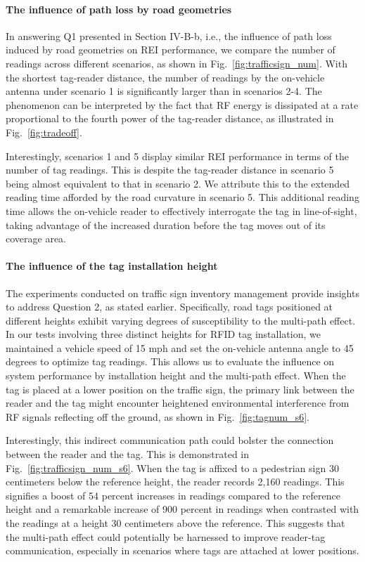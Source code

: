 \documentclass[lettersize,journal]{IEEEtran}
\begin{document}
\paragraph{The influence of path loss by road geometries}
In answering Q1 presented in Section IV-B-b, i.e., the influence of path loss induced by road geometries on REI performance, we compare the number of readings across different scenarios, as shown in Fig.~\ref{fig:trafficsign_num}. With the shortest tag-reader distance, the number of readings by the on-vehicle antenna under scenario 1 is significantly larger than in scenarios 2-4. The phenomenon can be interpreted by the fact that RF energy is dissipated at a rate proportional to the fourth power of the tag-reader distance, as illustrated in Fig.~\ref{fig:tradeoff}.

Interestingly, scenarios 1 and 5 display similar REI performance in terms of the number of tag readings. This is despite the tag-reader distance in scenario 5 being almost equivalent to that in scenario 2. We attribute this to the extended reading time afforded by the road curvature in scenario 5. This additional reading time allows the on-vehicle reader to effectively interrogate the tag in line-of-sight, taking advantage of the increased duration before the tag moves out of its coverage area. 



\paragraph{The influence of the tag installation height}
The experiments conducted on traffic sign inventory management provide insights to address Question 2, as stated earlier. Specifically, road tags positioned at different heights exhibit varying degrees of susceptibility to the multi-path effect. In our tests involving three distinct heights for RFID tag installation, we maintained a vehicle speed of 15 mph and set the on-vehicle antenna angle to 45 degrees to optimize tag readings. This allows us to evaluate the influence on system performance by installation height and the multi-path effect. When the tag is placed at a lower position on the traffic sign, the primary link between the reader and the tag might encounter heightened environmental interference from RF signals reflecting off the ground, as shown in Fig.~\ref{fig:tagnum_s6}.

Interestingly, this indirect communication path could bolster the connection between the reader and the tag. This is demonstrated in Fig.~\ref{fig:trafficsign_num_s6}. When the tag is affixed to a pedestrian sign 30 centimeters below the reference height, the reader records 2,160 readings. This signifies a boost of 54 percent increases in readings compared to the reference height and a remarkable increase of 900 percent in readings when contrasted with the readings at a height 30 centimeters above the reference. This suggests that the multi-path effect could potentially be harnessed to improve reader-tag communication, especially in scenarios where tags are attached at lower positions.
\end{document}

